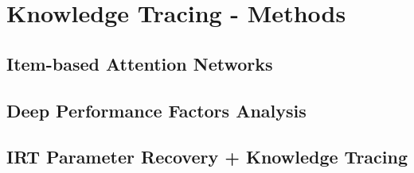 \chapter{Knowledge Tracing - Methods}

\section{Item-based Attention Networks}


\section{Deep Performance Factors Analysis}


\section{IRT Parameter Recovery + Knowledge Tracing}


